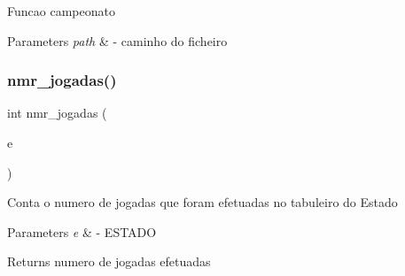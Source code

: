 Funcao campeonato 
\begin{DoxyParams}{Parameters}
{\em path} & -\/ caminho do ficheiro \\
\hline
\end{DoxyParams}
\mbox{\label{bot_8h_a532a3b432f313189689750099c2af5c3}} 
\subsubsection{nmr\_jogadas()}
{\footnotesize\ttfamily int nmr\+\_\+jogadas (\begin{DoxyParamCaption}\item[{\textbf{ E\+S\+T\+A\+DO} $\ast$}]{e }\end{DoxyParamCaption})}

Conta o numero de jogadas que foram efetuadas no tabuleiro do Estado 
\begin{DoxyParams}{Parameters}
{\em e} & -\/ E\+S\+T\+A\+DO \\
\hline
\end{DoxyParams}
\begin{DoxyReturn}{Returns}
numero de jogadas efetuadas 
\end{DoxyReturn}
